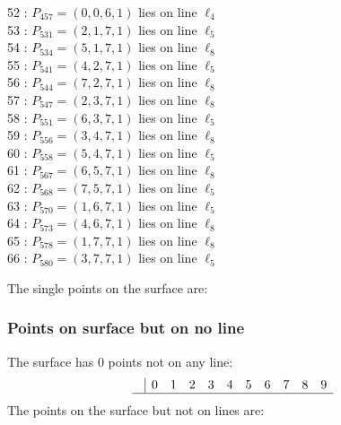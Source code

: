 \documentclass{article}
\begin{document}
{\begin{multicols}{2}
52 : $P_{457}=( 0, 0, 6, 1 )$ lies on line $\ell_{4}$\\
53 : $P_{531}=( 2, 1, 7, 1 )$ lies on line $\ell_{5}$\\
54 : $P_{534}=( 5, 1, 7, 1 )$ lies on line $\ell_{8}$\\
55 : $P_{541}=( 4, 2, 7, 1 )$ lies on line $\ell_{5}$\\
56 : $P_{544}=( 7, 2, 7, 1 )$ lies on line $\ell_{8}$\\
57 : $P_{547}=( 2, 3, 7, 1 )$ lies on line $\ell_{8}$\\
58 : $P_{551}=( 6, 3, 7, 1 )$ lies on line $\ell_{5}$\\
59 : $P_{556}=( 3, 4, 7, 1 )$ lies on line $\ell_{8}$\\
60 : $P_{558}=( 5, 4, 7, 1 )$ lies on line $\ell_{5}$\\
61 : $P_{567}=( 6, 5, 7, 1 )$ lies on line $\ell_{8}$\\
62 : $P_{568}=( 7, 5, 7, 1 )$ lies on line $\ell_{5}$\\
63 : $P_{570}=( 1, 6, 7, 1 )$ lies on line $\ell_{5}$\\
64 : $P_{573}=( 4, 6, 7, 1 )$ lies on line $\ell_{8}$\\
65 : $P_{578}=( 1, 7, 7, 1 )$ lies on line $\ell_{8}$\\
66 : $P_{580}=( 3, 7, 7, 1 )$ lies on line $\ell_{5}$\\
\end{multicols}
The single points on the surface are:\\
\subsubsection*{Points on surface but on no line}
The surface has 0 points not on any line:\\
$$
\begin{array}{r|*{10}{r}}
 & 0 & 1 & 2 & 3 & 4 & 5 & 6 & 7 & 8 & 9\\
\hline
\end{array}
$$
The points on the surface but not on lines are:\\
\begin{multicols}{2}
\noindent
\end{multicols}
}
\end{document}
